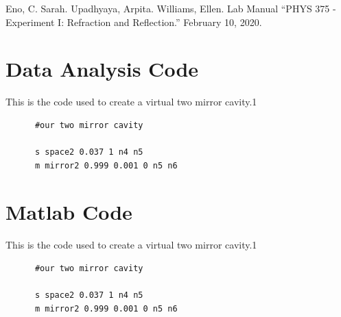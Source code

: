 \documentclass[colorlinks=true,pdfstartview=FitV,linkcolor=blue,
            citecolor=red,urlcolor=magenta]{basedoc}
\begin{document}
\begin{thebibliography}{9}

    Eno, C. Sarah. Upadhyaya, Arpita. Williams, Ellen. Lab Manual ``PHYS 375 - Experiment I: Refraction and Reflection.'' February 10, 2020.


\end{thebibliography} %


\appendix \clearpage

\section{Data Analysis Code} \label{appendix:a}

  This is the code used to create a virtual two mirror cavity.1
    \begin{verbatim}
      #our two mirror cavity

      s space2 0.037 1 n4 n5
      m mirror2 0.999 0.001 0 n5 n6
    \end{verbatim}



\section{Matlab Code} \label{appendix:B}

  This is the code used to create a virtual two mirror cavity.1
    \begin{verbatim}
      #our two mirror cavity

      s space2 0.037 1 n4 n5
      m mirror2 0.999 0.001 0 n5 n6
    \end{verbatim}
\end{document}
